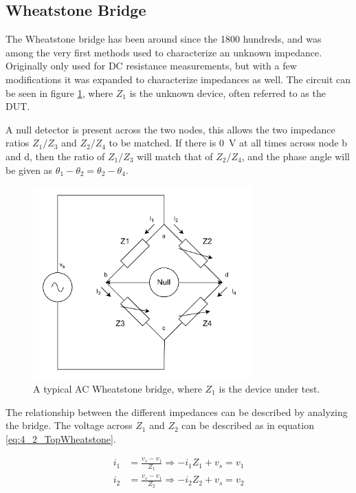 \subsection{Wheatstone Bridge} \label{ssec:BridgeCircuits}
The Wheatstone bridge has been around since the 1800 hundreds, and was among the very first methods used to characterize an unknown impedance. Originally only used for DC resistance measurements, but with a few modifications it was expanded to characterize impedances as well. 
The circuit can be seen in figure \ref{fig_4_2_WheatstoneBridge}, where $Z_1$ is the unknown device,
 often referred to as the DUT.
 
A null detector is present across the two nodes, this allows the two impedance ratios $Z_1/Z_3$ and $Z_2/Z_4$
to be matched. If there is \SI{0}{\volt} at all times across node b and d, then the ratio of $Z_1/Z_3$ will match that of
 $Z_2/Z_4$, and the
phase angle will be given as $\theta_1 - \theta_2 = \theta_2 - \theta_4$. 

\begin{figure}[H]
    \centering
    \includegraphics[width=0.75\textwidth]{Sections/4_TechnicalAnalysis/Figures_JFT/WheatstoneBridgeAC.pdf}
    \caption{A typical AC Wheatstone bridge, where $Z_1$ is the device under test.}
    \label{fig_4_2_WheatstoneBridge}
\end{figure}

The relationship between the different impedances can be described by analyzing the bridge. The voltage across $Z_1$ and $Z_2$ can
be described as in equation \ref*{eq:4_2_TopWheatstone}.

\begin{equation}
    \begin{split}
        \label{eq:4_2_TopWheatstone}
        i_1 &= \frac{v_s-v_1}{Z_1} \Rightarrow -i_1 Z_1 +v_s = v_1 \\
        i_2 &= \frac{v_s-v_1}{Z_2} \Rightarrow -i_2 Z_2 + v_s = v_2
    \end{split}
\end{equation}

